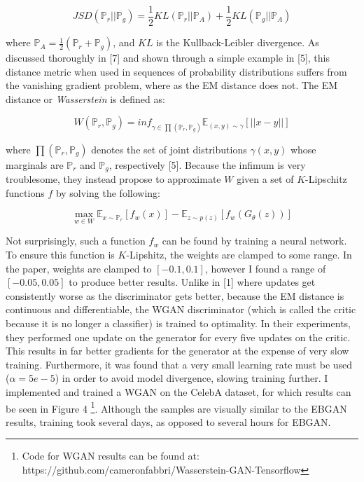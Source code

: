 \documentclass[9pt]{article}
\begin{document}
\[JSD(\mathbb{P}_r||\mathbb{P}_g) = \frac{1}{2} KL(\mathbb{P}_r || \mathbb{P}_A) + \frac{1}{2}KL(\mathbb{P}_g || \mathbb{P}_A)\]

\noindent where $\mathbb{P}_A = \frac{1}{2}(\mathbb{P}_r + \mathbb{P}_g)$, and $KL$ is the Kullback-Leibler divergence. As discussed thoroughly in [7] and shown through a simple example
in [5], this distance metric when used in sequences of probability distributions suffers from the vanishing gradient problem, where as the EM distance does not. The EM distance or
\textit{Wasserstein} is defined as:

\[ W(\mathbb{P}_r, \mathbb{P}_g) = inf_{\gamma \in \prod (\mathbb{P}_r, \mathbb{P}_g)} \mathbb{E}_{({x,y})\sim \gamma} [ || x - y || ] \]

\noindent where $\prod (\mathbb{P}_r, \mathbb{P}_g)$ denotes the set of joint distributions $\gamma (x,y)$ whose marginals are $\mathbb{P}_r$ and $\mathbb{P}_g$, respectively [5]. Because
the infimum is very troublesome, they instead propose to approximate $W$ given a set of $K$-Lipschitz functions $f$ by solving the following:

\[ \max\limits_{w \in W} \mathbb{E}_{x \sim \mathbb{P}_r}[f_w(x)] - \mathbb{E}_{z \sim p(z)}[f_w(G_{\theta}(z))]\]

\noindent Not surprisingly, such a function $f_w$ can be found by training a neural network. To ensure this function is $K$-Lipshitz, the weights are clamped to some range. In the paper, weights
are clamped to $[-0.1, 0.1]$, however I found a range of $[-0.05, 0.05]$ to produce better results.
Unlike in [1] where updates get consistently worse as the discriminator gets better, because the EM distance is continuous and differentiable, the WGAN discriminator (which is called the critic
because it is no longer a classifier) is trained to optimality. In their experiments, they performed one update on the generator for every five updates on the critic. This results in far better
gradients for the generator at the expense of very slow training. Furthermore, it was found that a very small learning rate must be used ($\alpha = 5e-5$) in order to avoid model divergence,
slowing training further. I implemented and trained a WGAN on the CelebA dataset, for which results can be seen in Figure 4 \footnote{Code for WGAN results can be found at:
https://github.com/cameronfabbri/Wasserstein-GAN-Tensorflow}.
Although the samples are visually similar to the EBGAN results, training took several days, as opposed to several hours for EBGAN. \newline
\end{document}
